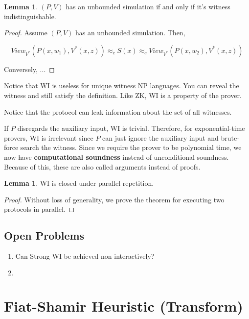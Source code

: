 \documentclass{article}
\theoremstyle{definition}
\newtheorem{lemma}[theorem]{Lemma}
\begin{document}
\begin{lemma}
    $(P,V)$ has an unbounded simulation if and only if it's witness indistinguishable.
\end{lemma}
\begin{proof}
    Assume $(P,V)$ has an unbounded simulation. Then,

    \[ View_{V^{*}}(P(x,w_{1}), V^{*}(x,z)) \approx_{c} S(x) \approx_{c} View_{V^{*}}(P(x,w_{2}), V^{*}(x,z)) \]

    Conversely, ...
\end{proof}

Notice that WI is useless for unique witness NP languages. You can reveal the witness and still satisfy
the definition. Like ZK, WI is a property of the prover.

Notice that the protocol can leak information about the set of all witnesses.

If $P$ disregards the auxiliary input, WI is trivial. Therefore, for exponential-time provers, WI is irrelevant
since $P$ can just ignore the auxiliary input and brute-force search the witness. Since we require the prover
to be polynomial time, we now have \textbf{computational soundness} instead of unconditional soundness.
Because of this, these are also called arguments instead of proofs.

\begin{lemma}
    WI is closed under parallel repetition.
\end{lemma}
\begin{proof}
    Without loss of generality, we prove the theorem for executing two protocols in parallel.


\end{proof}


\subsection{Open Problems}

\begin{enumerate}
    \item Can Strong WI be achieved non-interactively?
    \item 
\end{enumerate}

\newpage

\section{Fiat-Shamir Heuristic (Transform)}
\end{document}
